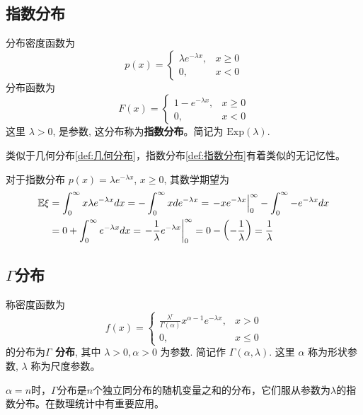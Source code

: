 \subsection{指数分布}\label{subsec:指数分布}
\begin{definition}[指数分布]\label{def:指数分布}
分布密度函数为
\begin{equation} \label{eq:exponential_pdf}
p(x)=
\begin{cases}
\lambda e^{-\lambda x}, & x\ge 0 \\
0, & x<0
\end{cases}
\end{equation}
分布函数为
\begin{equation} \label{eq:exponential_cdf}
F(x)=
\begin{cases}
1-e^{-\lambda x}, & x\ge 0 \\
0, & x<0
\end{cases}
\end{equation}
这里 $\lambda>0$, 是参数, 这分布称为\textbf{指数分布}。简记为 $\text{Exp}(\lambda)$.
\end{definition}
\begin{remark}
    类似于几何分布\eqref{def:几何分布}，指数分布\eqref{def:指数分布}有着类似的无记忆性。
\end{remark}
\begin{proposition} \label{prop:exponential_expectation}
对于指数分布 $p(x) = \lambda e^{-\lambda x}$, $x\ge0$, 其数学期望为
\begin{align*}
\mathbb{E}\xi &= \int_0^\infty x \lambda e^{-\lambda x} dx 
= -\int_0^\infty x de^{-\lambda x} 
= \left. -xe^{-\lambda x} \right|_0^\infty - \int_0^\infty -e^{-\lambda x} dx \\
&= 0 + \int_0^\infty e^{-\lambda x} dx 
= \left. -\frac{1}{\lambda}e^{-\lambda x} \right|_0^\infty 
= 0 - \left(-\frac{1}{\lambda}\right)
= \frac{1}{\lambda}
\end{align*}
\end{proposition}
\subsection{$\Gamma$分布}\label{subsec:Gamma分布}
\begin{definition}
    称密度函数为
\begin{equation} \label{eq:gamma_pdf}
f(x)=
\begin{cases}
\frac{\lambda^r}{\Gamma(\alpha)}x^{\alpha-1}e^{-\lambda x}, & x>0 \\
0, & x\le 0
\end{cases}
\end{equation}
的分布为\textbf{$\Gamma$ 分布}, 其中 $\lambda>0, \alpha>0$ 为参数. 简记作 $\Gamma(\alpha,\lambda)$. 这里 $\alpha$ 称为形状参数, $\lambda$ 称为尺度参数。
\end{definition}
\begin{remark}
    $\alpha = n$时，$\Gamma$分布是$n$个独立同分布的随机变量之和的分布，它们服从参数为$\lambda$的指数分布。在数理统计中有重要应用。
\end{remark}

